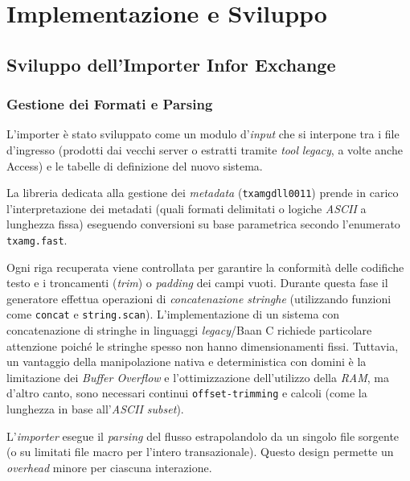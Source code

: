 \chapter{Implementazione e Sviluppo}\label{ch:implementazione-e-sviluppo}


\section{Sviluppo dell'Importer Infor Exchange}\label{sec:sviluppo-dell'importer-infor-exchange}

\subsection{Gestione dei Formati e Parsing}\label{subsec:gestione-dei-formati-e-parsing}
L'importer è stato sviluppato come un modulo d'\textit{input} che si interpone tra i file d'ingresso
(prodotti dai vecchi server o estratti tramite \textit{tool} \textit{legacy}, a volte anche Access) e le tabelle di definizione del nuovo sistema.

La libreria dedicata alla gestione dei \textit{metadata} (\texttt{txamgdll0011}) prende in carico l'interpretazione dei metadati
(quali formati delimitati o logiche \textit{ASCII} a lunghezza fissa) eseguendo conversioni su base parametrica secondo
l'enumerato \texttt{txamg.fast}.

Ogni riga recuperata viene controllata per garantire la conformità delle codifiche testo e i troncamenti (\textit{trim}) o \textit{padding} dei campi vuoti.
Durante questa fase il generatore effettua operazioni di \textit{concatenazione stringhe} (utilizzando funzioni come \texttt{concat} e \texttt{string.scan}). 
L'implementazione di un sistema con concatenazione di stringhe in linguaggi \textit{legacy}/Baan C richiede particolare attenzione poiché le stringhe spesso non hanno dimensionamenti
fissi.
Tuttavia, un vantaggio della manipolazione nativa e deterministica con domini è la limitazione dei \textit{Buffer Overflow} e l'ottimizzazione dell'utilizzo della \textit{RAM},
ma d'altro canto, sono necessari continui \texttt{offset-trimming} e calcoli (come la lunghezza in base all'\textit{ASCII subset}).

L'\textit{importer} esegue il \textit{parsing} del flusso estrapolandolo da un singolo file sorgente (o su limitati file macro per l'intero transazionale).
Questo design permette un \textit{overhead} minore per ciascuna interazione.

